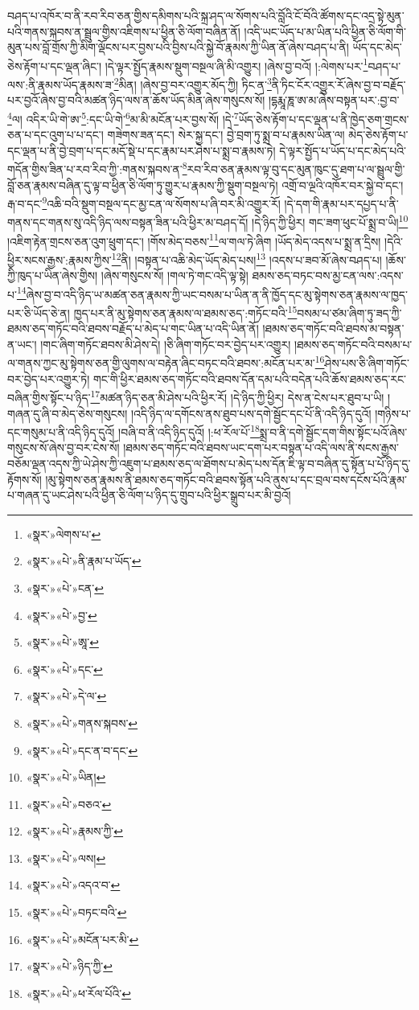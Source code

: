 བཤད་པ་འཁོར་བ་ནི་རབ་རིབ་ཅན་གྱིས་དམིགས་པའི་སྐྲ་ཤད་ལ་སོགས་པའི་བློའི་ངོ་བོའི་ཚོགས་དང་འདྲ་སྟེ་མུན་པའི་གནས་སྐབས་ན་སྦྲུལ་གྱིས་འཇིགས་པ་ཕྱིན་ཅི་ལོག་བཞིན་ནོ། །འདི་ཡང་ཡོད་པ་མ་ཡིན་པའི་ཕྱིན་ཅི་ལོག་གི་མུན་པས་བློ་གྲོས་ཀྱི་མིག་ལྡོངས་པར་བྱས་པའི་བྱིས་པའི་སྐྱེ་བོ་རྣམས་ཀྱི་ཡིན་ནོ་ཞེས་བཤད་པ་ནི། ཡོད་དང་མེད་ཅེས་རྟོག་པ་དང་ལྡན་ཞིང་། །དེ་ལྟར་སྤྱོད་རྣམས་སྡུག་བསྔལ་ཞི་མི་འགྱུར། །ཞེས་བྱ་བའོ། །:ལེགས་པར་\footnote{«སྣར་»ལེགས་པ་}བཤད་པ་ལས་:ནི་རྣམས་ཡོད་རྣམས་ཟ་\footnote{«སྣར་»«པེ་»ནི་རྣམ་པ་ཡོད་}མིན། །ཞེས་བྱ་བར་འགྱུར་མོད་ཀྱི། ཏིང་ན་\footnote{«སྣར་»«པེ་»ངན་}ནི་ཏིང་ངོར་འགྱུར་རོ་ཞེས་བྱ་བ་བརྗོད་པར་བྱའོ་ཞེས་བྱ་བའི་མཚན་ཉིད་ལས་ན་ཆོས་ཡོད་མིན་ཞེས་གསུངས་སོ། །དྷརྨཱ་ཎཱ་ཨ་མ་ཞེས་བསྟན་པར་:བྱ་བ་\footnote{«སྣར་»«པེ་»བྱ་}ལ། འདིར་ཡི་གེ་ཨ་\footnote{«སྣར་»«པེ་»ཨཱ་}:དང་ཡི་གེ་\footnote{«སྣར་»«པེ་»དང་}མ་མི་མངོན་པར་བྱས་སོ། །དེ་\footnote{«སྣར་»«པེ་»དེ་ལ་}ཡོད་ཅེས་རྟོག་པ་དང་ལྡན་པ་ནི་ཁྱེད་ཅག་གྲངས་ཅན་པ་དང་འུག་པ་པ་དང་། གཟེགས་ཟན་དང་། སེར་སྐྱ་དང་། བྱེ་བྲག་ཏུ་སྨྲ་བ་པ་རྣམས་ཡིན་ལ། མེད་ཅེས་རྟོག་པ་དང་ལྡན་པ་ནི་བྱེ་བྲག་པ་དང་མདོ་སྡེ་པ་དང་རྣམ་པར་ཤེས་པ་སྨྲ་བ་རྣམས་ཏེ། དེ་ལྟར་སྤྱོད་པ་ཡོད་པ་དང་མེད་པའི་གདོན་གྱིས་ཟིན་པ་རབ་རིབ་ཀྱི་:གནས་སྐབས་ན་\footnote{«སྣར་»«པེ་»གནས་སྐབས་}རབ་རིབ་ཅན་རྣམས་ལྟ་བུ་དང་མུན་ཁུང་དུ་ཐག་པ་ལ་སྦྲུལ་གྱི་བློ་ཅན་རྣམས་བཞིན་དུ་ལྟ་བ་ཕྱིན་ཅི་ལོག་ཏུ་གྱུར་པ་རྣམས་ཀྱི་སྡུག་བསྔལ་ཏེ། འགྲོ་བ་ལྔའི་འཁོར་བར་སྐྱེ་བ་དང་། རྒ་བ་དང་\footnote{«སྣར་»«པེ་»དང་ན་བ་དང་}འཆི་བའི་སྡུག་བསྔལ་དང་མྱ་ངན་ལ་སོགས་པ་ཞི་བར་མི་འགྱུར་རོ། །དེ་དག་གི་རྣམ་པར་དཔྱད་པ་ནི་གནས་དང་གནས་སུ་འདི་ཉིད་ལས་བསྟན་ཟིན་པའི་ཕྱིར་མ་བཤད་དོ། །དེ་ཉིད་ཀྱི་ཕྱིར། གང་ཟག་ཕུང་པོ་སྨྲ་བ་ཡི།\footnote{«སྣར་»«པེ་»ཡིན།} །འཇིག་རྟེན་གྲངས་ཅན་འུག་ཕྲུག་དང་། །གོས་མེད་བཅས་\footnote{«སྣར་»«པེ་»བཅའ་}ལ་གལ་ཏེ་ཞིག །ཡོད་མེད་འདས་པ་སྨྲ་ན་དྲིས། །དེའི་ཕྱིར་སངས་རྒྱས་:རྣམས་ཀྱིས་\footnote{«སྣར་»«པེ་»རྣམས་ཀྱི་}ནི། །བསྟན་པ་འཆི་མེད་ཡོད་མེད་པས།\footnote{«སྣར་»«པེ་»ལས།} །འདས་པ་ཟབ་མོ་ཞེས་བཤད་པ། །ཆོས་ཀྱི་ཁུད་པ་ཡིན་ཞེས་གྱིས། །ཞེས་གསུངས་སོ། །གལ་ཏེ་གང་འདི་ལྟ་སྟེ། ཐམས་ཅད་བཏང་བས་མྱ་ངན་ལས་:འདས་པ་\footnote{«སྣར་»«པེ་»འདའ་བ་}ཞེས་བྱ་བ་འདི་ཉིད་ཡ་མཚན་ཅན་རྣམས་ཀྱི་ཡང་བསམ་པ་ཡིན་ན་ནི་ཁྱོད་དང་མུ་སྟེགས་ཅན་རྣམས་ལ་ཁྱད་པར་ཅི་ཡོད་ཅེ་ན། ཁྱད་པར་ནི་མུ་སྟེགས་ཅན་རྣམས་ལ་ཐམས་ཅད་:གཏོང་བའི་\footnote{«སྣར་»«པེ་»བཏང་བའི་}བསམ་པ་ཙམ་ཞིག་ཏུ་ཟད་ཀྱི་ཐམས་ཅད་གཏོང་བའི་ཐབས་བརྗོད་པ་མེད་པ་གང་ཡིན་པ་འདི་ཡིན་ནོ། །ཐམས་ཅད་གཏོང་བའི་ཐབས་མ་བསྟན་ན་ཡང་། །གང་ཞིག་གཏོང་ཐབས་མི་ཤེས་དེ། །ཅི་ཞིག་གཏོང་བར་བྱེད་པར་འགྱུར། །ཐམས་ཅད་གཏོང་བའི་བསམ་པ་ལ་གནས་ཀྱང་མུ་སྟེགས་ཅན་གྱི་ལུགས་ལ་བརྟེན་ཞིང་བཏང་བའི་ཐབས་:མངོན་པར་མ་\footnote{«སྣར་»«པེ་»མངོན་པར་མི་}ཤེས་པས་ཅི་ཞིག་གཏོང་བར་བྱེད་པར་འགྱུར་ཏེ། གང་གི་ཕྱིར་ཐམས་ཅད་གཏོང་བའི་ཐབས་དོན་དམ་པའི་བདེན་པའི་ཆོས་ཐམས་ཅད་རང་བཞིན་གྱིས་སྟོང་པ་ཉིད་\footnote{«སྣར་»«པེ་»ཉིད་ཀྱི་}མཚན་ཉིད་ཅན་མི་ཤེས་པའི་ཕྱིར་རོ། །དེ་ཉིད་ཀྱི་ཕྱིར། དེས་ན་ངེས་པར་ཐུབ་པ་ཡི། །གཞན་དུ་ཞི་བ་མེད་ཅེས་གསུངས། །འདི་ཉིད་ལ་དགོངས་ནས་ཐུབ་པས་དགེ་སྦྱོང་དང་པོ་ནི་འདི་ཉིད་དུའོ། །གཉིས་པ་དང་གསུམ་པ་ནི་འདི་ཉིད་དུའོ། །བཞི་བ་ནི་འདི་ཉིད་དུའོ། །:ཕ་རོལ་པོ་\footnote{«སྣར་»«པེ་»ཕ་རོལ་པོའི་}སྨྲ་བ་ནི་དགེ་སྦྱོང་དག་གིས་སྟོང་པའོ་ཞེས་གསུངས་སོ་ཞེས་བྱ་བར་ངེས་སོ། །ཐམས་ཅད་གཏོང་བའི་ཐབས་ཡང་དག་པར་བསྟན་པ་འདི་ལས་ནི་སངས་རྒྱས་བཅོམ་ལྡན་འདས་ཀྱི་ཡེ་ཤེས་ཀྱི་འཇུག་པ་ཐམས་ཅད་ལ་ཐོགས་པ་མེད་པས་དོན་ཇི་ལྟ་བ་བཞིན་དུ་སྟོན་པ་པོ་ཉིད་དུ་རྟོགས་སོ། །མུ་སྟེགས་ཅན་རྣམས་ནི་ཐམས་ཅད་གཏོང་བའི་ཐབས་སྟོན་པའི་ནུས་པ་དང་བྲལ་བས་དངོས་པོའི་རྣམ་པ་གཞན་དུ་ཡང་ཤེས་པའི་ཕྱིན་ཅི་ལོག་པ་ཉིད་དུ་གྲུབ་པའི་ཕྱིར་སྒྲུབ་པར་མི་བྱའོ། 